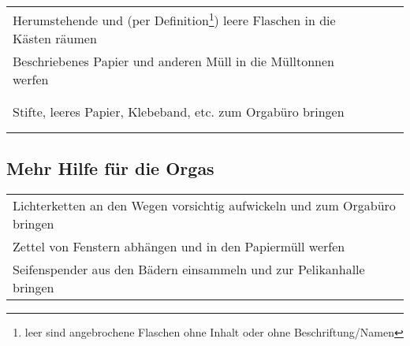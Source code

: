 \documentclass[14pt,parskip=full+]{scrartcl}
\newcommand{\checkfield}{~ \hfill ~\raisebox{-5pt}{\tikz\node[draw,minimum width=16.8pt,minimum height=16.8pt]{};}}
\begin{document}
\bigskip

\def\arraystretch{1.3}

\begin{tabularx}{\textwidth}{Xc}
 Herumstehende und (per Definition\footnote{leer sind angebrochene Flaschen ohne Inhalt oder ohne Beschriftung/Namen}) leere Flaschen in die Kästen räumen & \checkfield \\
 Beschriebenes Papier und anderen Müll in die Mülltonnen werfen & \checkfield \\
 Stifte, leeres Papier, Klebeband, etc. zum Orgabüro bringen & \checkfield \\
\end{tabularx}

\subsection*{Mehr Hilfe für die Orgas}
\begin{tabularx}{\textwidth}{X}
 Lichterketten an den Wegen vorsichtig aufwickeln und zum Orgabüro bringen \\
 Zettel von Fenstern abhängen und in den Papiermüll werfen \\
 Seifenspender aus den Bädern einsammeln und zur Pelikanhalle bringen \\
\end{tabularx}
\end{document}
